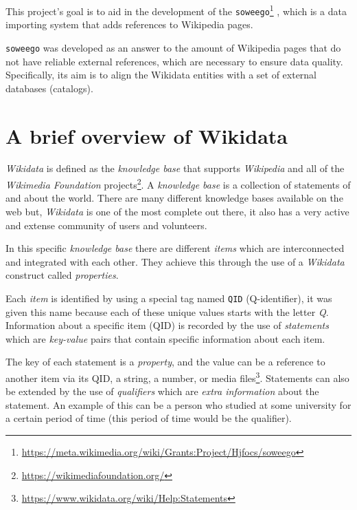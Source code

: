 \documentclass[epsfig,a4paper,11pt,titlepage,twoside,openany]{book}
\newcommand{\footurl}[1]{\footnote{\url{#1}}}
\begin{document}



This project's goal is to aid in the development of the
\texttt{soweego}\footurl{https://meta.wikimedia.org/wiki/Grants:Project/Hjfocs/soweego}
, which is a data importing system that adds references to Wikipedia
pages.

\texttt{soweego} was developed as an answer to the amount of Wikipedia pages that
do not have reliable external references, which are necessary to ensure data
quality. Specifically, its aim is to align the Wikidata entities with a set of
external databases (catalogs).


\section{A brief overview of Wikidata}
\label{sec:intro-wikidata}

\textit{Wikidata} is defined as the \textit{knowledge base} that supports
\textit{Wikipedia} and all of the \textit{Wikimedia Foundation}
projects\footurl{https://wikimediafoundation.org/}. A \textit{knowledge base} is a collection of statements of and about the world. There are many different knowledge bases available on the web but, \textit{Wikidata} is one of the most complete out there, it also has a very active and extense community of users and volunteers. 

In this specific \textit{knowledge base} there are different \textit{items} which are interconnected and integrated with each other. They achieve this through the use of a \textit{Wikidata} construct called 
\textit{properties}. 

Each \textit{item} is identified by using a special tag named \texttt{QID} (Q-identifier), it was given this name because each of these unique values starts with the letter \textit{Q}. Information about a specific item (QID) is
recorded by the use of \textit{statements} which are \textit{key-value} pairs
that contain specific information about each item.

The key of each statement is a \textit{property}, and the value can be a reference to another item via its QID, a string, a number, or media
files\footurl{https://www.wikidata.org/wiki/Help:Statements}. Statements can
also be extended by the use of \textit{qualifiers} which are \textit{extra information} about the
statement. An example of this can be a person who studied at some university for
a certain period of time (this period of time would be the qualifier).
\end{document}
